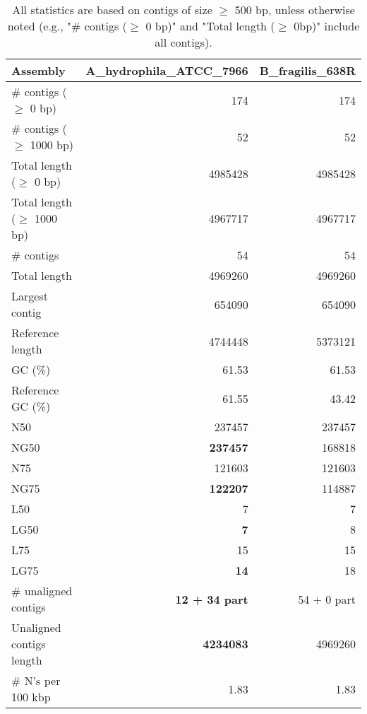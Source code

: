 \documentclass[12pt,a4paper]{article}
\begin{document}
\begin{table}[ht]
\begin{center}
\caption{All statistics are based on contigs of size $\geq$ 500 bp, unless otherwise noted (e.g., "\# contigs ($\geq$ 0 bp)" and "Total length ($\geq$ 0bp)" include all contigs).}
\begin{tabular}{|l*{2}{|r}|}
\hline
Assembly & A\_hydrophila\_ATCC\_7966 & B\_fragilis\_638R \\ \hline
\# contigs ($\geq$ 0 bp) & 174 & 174 \\ \hline
\# contigs ($\geq$ 1000 bp) & 52 & 52 \\ \hline
Total length ($\geq$ 0 bp) & 4985428 & 4985428 \\ \hline
Total length ($\geq$ 1000 bp) & 4967717 & 4967717 \\ \hline
\# contigs & 54 & 54 \\ \hline
Total length & 4969260 & 4969260 \\ \hline
Largest contig & 654090 & 654090 \\ \hline
Reference length & 4744448 & 5373121 \\ \hline
GC (\%) & 61.53 & 61.53 \\ \hline
Reference GC (\%) & 61.55 & 43.42 \\ \hline
N50 & 237457 & 237457 \\ \hline
NG50 & {\bf 237457} & 168818 \\ \hline
N75 & 121603 & 121603 \\ \hline
NG75 & {\bf 122207} & 114887 \\ \hline
L50 & 7 & 7 \\ \hline
LG50 & {\bf 7} & 8 \\ \hline
L75 & 15 & 15 \\ \hline
LG75 & {\bf 14} & 18 \\ \hline
\# unaligned contigs & {\bf 12 + 34 part} & 54 + 0 part \\ \hline
Unaligned contigs length & {\bf 4234083} & 4969260 \\ \hline
\# N's per 100 kbp & 1.83 & 1.83 \\ \hline
\end{tabular}
\end{center}
\end{table}
\end{document}
